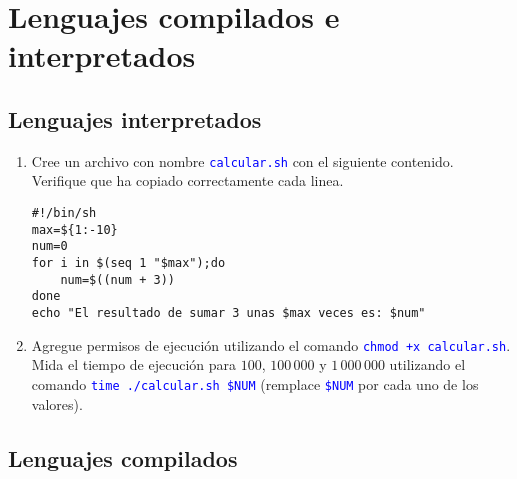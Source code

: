 \documentclass[12pt]{article}
\newcommand{\cw}[1]{\texttt{\textcolor{blue}{#1}}}
\begin{document}
\section{Lenguajes compilados e interpretados}

\subsection{Lenguajes interpretados}

\begin{enumerate}[resume]

    \item Cree un archivo con nombre \cw{calcular.sh} con el siguiente
        contenido. Verifique que ha copiado correctamente cada linea.

        \begin{verbatim}
#!/bin/sh
max=${1:-10}
num=0
for i in $(seq 1 "$max");do
    num=$((num + 3))
done
echo "El resultado de sumar 3 unas $max veces es: $num"
        \end{verbatim}

    \item Agregue permisos de ejecución utilizando el comando \cw{chmod +x
        calcular.sh}. Mida el tiempo de ejecución para $100$, $100\,000$ y
        $1\,000\,000$ utilizando el comando \cw{time ./calcular.sh \$NUM}
        (remplace \cw{\$NUM} por cada uno de los valores).

\end{enumerate}

\subsection{Lenguajes compilados}
\end{document}
